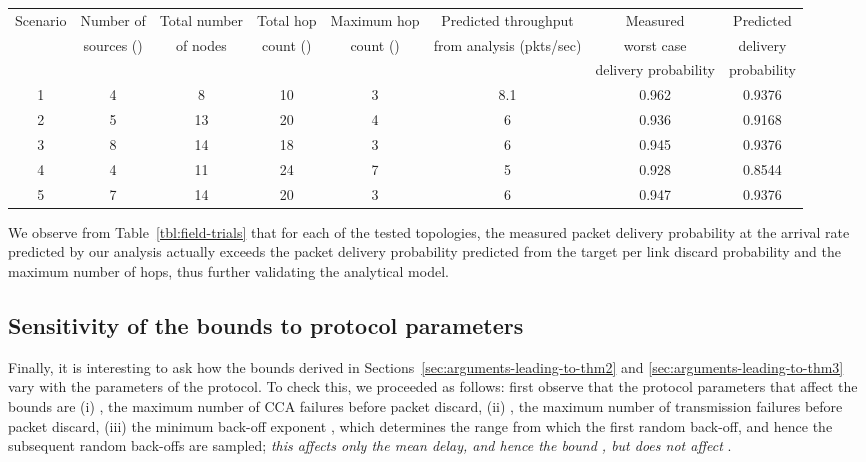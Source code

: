 \documentclass[12pt, draftclsnofoot, onecolumn]{IEEEtran}
\begin{document}
\begin{table*}[ht]
  \centering
\caption{Results from experiments with actual motes; column 7 reports the measured worst case packet delivery probability \emph{over all sources} for each topology}
\label{tbl:field-trials}
\scriptsize
  \begin{tabular}{|c|c|c|c|c|c|c|c|}\hline
    Scenario &Number of & Total number & Total hop & Maximum hop & Predicted throughput  & Measured & Predicted\\
          & sources () & of nodes  & count () & count () & from analysis (pkts/sec) & worst case & delivery\\
          &               &           &            &             &                       &  delivery probability & probability\\
         
 \hline
    1 & 4 & 8 & 10 & 3 & 8.1 & 0.962 & 0.9376\\
 \hline
    2 & 5 & 13 & 20 & 4 & 6 & 0.936 & 0.9168\\
 \hline
    3 & 8 & 14 & 18 & 3 & 6 & 0.945 & 0.9376\\
 \hline
    4 & 4 & 11 & 24 & 7 & 5 & 0.928 & 0.8544\\
 \hline
    5 & 7 & 14 & 20 & 3 & 6 & 0.947 & 0.9376\\
\hline
\end{tabular}
\normalsize
\vspace{-4.5mm}
\end{table*} 
We observe from Table~\ref{tbl:field-trials} that for each of the tested topologies, the measured packet delivery probability at the arrival rate predicted by our analysis actually exceeds the packet delivery probability predicted from the target per link discard probability and the maximum number of hops, thus further validating the analytical model. 

\subsection{Sensitivity of the bounds to protocol parameters}
Finally, it is interesting to ask how the bounds derived in Sections~\ref{sec:arguments-leading-to-thm2} and \ref{sec:arguments-leading-to-thm3} vary with the parameters of the protocol. To check this, we proceeded as follows: first observe that the protocol parameters that affect the bounds are (i) , the maximum number of CCA failures before packet discard, (ii) , the maximum number of transmission failures before packet discard, (iii) the minimum back-off exponent \cite{IEEE}, which determines the range from which the first random back-off, and hence the subsequent random back-offs are sampled; \emph{this affects only the mean delay, and hence the bound , but does not affect }.
\end{document}
